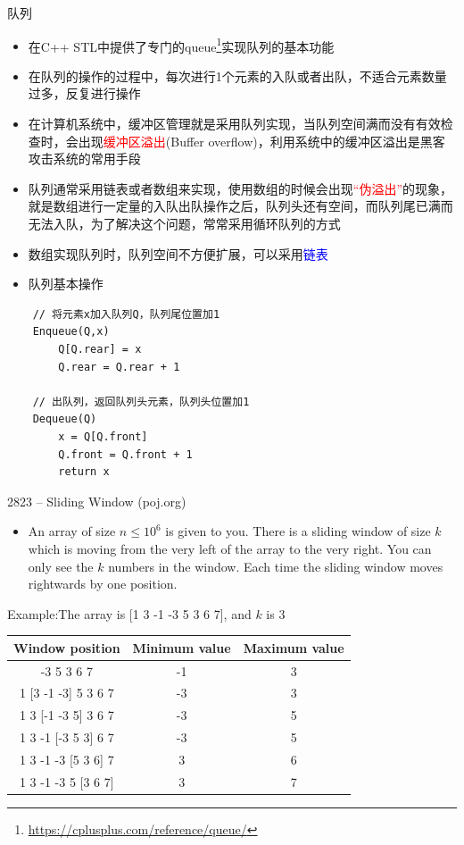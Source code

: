 \begin{frame}{队列}
    \begin{itemize}
        \item 在C++ STL中提供了专门的queue\footnote{\url{https://cplusplus.com/reference/queue/}}实现队列的基本功能
        \item 在队列的操作的过程中，每次进行1个元素的入队或者出队，不适合元素数量过多，反复进行操作
        \item 在计算机系统中，缓冲区管理就是采用队列实现，当队列空间满而没有有效检查时，会出现\textcolor{red}{缓冲区溢出}(Buffer overflow)，利用系统中的缓冲区溢出是黑客攻击系统的常用手段
        \item 队列通常采用链表或者数组来实现，使用数组的时候会出现\textcolor{red}{“伪溢出”}的现象，就是数组进行一定量的入队出队操作之后，队列头还有空间，而队列尾已满而无法入队，为了解决这个问题，常常采用循环队列的方式
        \item 数组实现队列时，队列空间不方便扩展，可以采用\textcolor{blue}{链表}
    \end{itemize}
\end{frame}    
\vspace*{6ex}
\begin{itemize}
    \item[] \Large{队列基本操作}
\end{itemize}
\begin{lstlisting}
    // 将元素x加入队列Q，队列尾位置加1
    Enqueue(Q,x)
        Q[Q.rear] = x
        Q.rear = Q.rear + 1
        
    // 出队列，返回队列头元素，队列头位置加1
    Dequeue(Q)
        x = Q[Q.front]
        Q.front = Q.front + 1
        return x
\end{lstlisting}
\begin{frame}{2823 -- Sliding Window (poj.org)}
    \begin{itemize}
        \item An array of size $n\leqslant10^6$ is given to you. There is a sliding window of size $k$ which is moving from the very left of the array to the very right. You can only see the $k$ numbers in the window. Each time the sliding window moves rightwards by one position. 
    \end{itemize}
    \begin{exampleblock}{Example:The array is [1 3 -1 -3 5 3 6 7], and $k$ is 3}
    \begin{table}
    \begin{tabular}{ccc}
        Window position & Minimum value & Maximum value\\
        \hline
        [1 3 -1] -3 5 3 6 7 & -1 & 3 \\
        1 [3 -1 -3] 5 3 6 7	& -3 & 3 \\
        1 3 [-1 -3 5] 3 6 7	& -3 & 5 \\ 
        1 3 -1 [-3 5 3] 6 7	& -3 & 5 \\
        1 3 -1 -3 [5 3 6] 7	& 3 & 6 \\
        1 3 -1 -3 5 [3 6 7]	& 3 & 7 \\
        \hline
    \end{tabular}
    \end{table}
    \end{exampleblock}
\end{frame}
